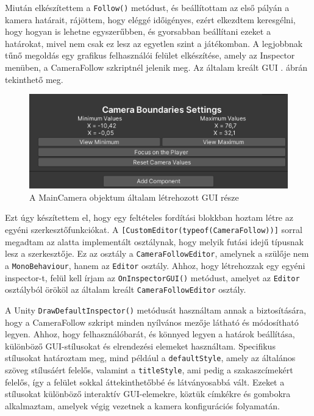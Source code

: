 Miután elkészítettem a \texttt{Follow()} metódust, és beállítottam az első pályán a kamera határait, rájöttem, hogy eléggé időigényes, ezért elkezdtem keresgélni, hogy hogyan is lehetne egyszerűbben, és gyorsabban beállítani ezeket a határokat, mivel nem csak ez lesz az egyetlen szint a játékomban. A legjobbnak tűnő megoldás egy grafikus felhasználói felület elkészítése, amely az Inspector menüben, a CameraFollow szkriptnél jelenik meg. Az általam kreált GUI . ábrán tekinthető meg.

\begin{figure}[ht]
\centering
\includegraphics[scale = 0.55]{images/gui.png}
\caption{A MainCamera objektum általam létrehozott GUI része}
\label{fig:gui}
\end{figure}

\newpage
Ezt úgy készítettem el, hogy egy feltételes fordítási blokkban hoztam létre az egyéni szerkesztőfunkciókat. A \texttt{[CustomEditor(typeof(CameraFollow))]} sorral megadtam az alatta implementált osztálynak, hogy melyik futási idejű típusnak lesz a szerkesztője. Ez az osztály a \texttt{CameraFollowEditor}, amelynek a szülője nem a \texttt{MonoBehaviour}, hanem az \texttt{Editor} osztály. Ahhoz, hogy létrehozzak egy egyéni inspector-t, felül kell írjam az \texttt{OnInspectorGUI()} metódust, amelyet az \texttt{Editor} osztályból örököl az általam kreált \texttt{CameraFollowEditor} osztály.

A Unity \texttt{DrawDefaultInspector()} metódusát használtam annak a biztosítására, hogy a CameraFollow szkript minden nyílvános mezője látható és módosítható legyen. Ahhoz, hogy felhasználóbarát, és könnyed legyen a határok beállítása, különböző GUI-stílusokat és elrendezési elemeket használtam. Specifikus stílusokat határoztam meg, mind például a \texttt{defaultStyle}, amely az általános szöveg stílusáért felelős, valamint a \texttt{titleStyle}, ami pedig a szakaszcímekért felelős, így a felület sokkal áttekinthetőbbé és látványosabbá vált. Ezeket a stílusokat különböző interaktív GUI-elemekre, köztük címkékre és gombokra alkalmaztam, amelyek végig vezetnek a kamera konfigurációs folyamatán.

